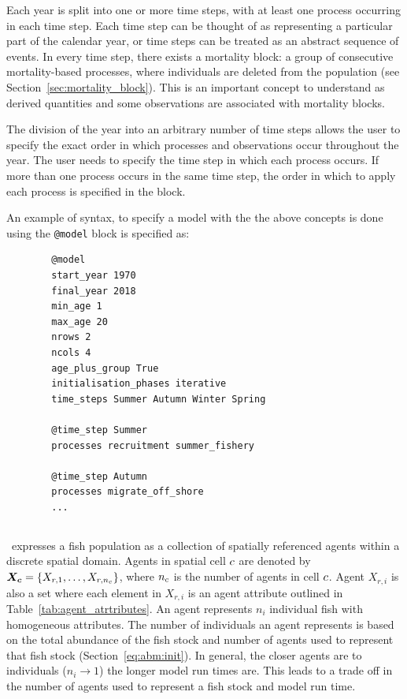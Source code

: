 Each year is split into one or more time steps, with at least one process occurring in each time step. Each time step can be thought of as representing a particular part of the calendar year, or time steps can be treated as an abstract sequence of events. In every time step, there exists a mortality block: a group of consecutive mortality-based processes, where individuals are deleted from the population (see Section~\ref{sec:mortality_block}). This is an important concept to understand as derived quantities and some observations are associated with mortality blocks.

The division of the year into an arbitrary number of time steps allows the user to specify the exact order in which processes and observations occur throughout the year. The user needs to specify the time step in which each process occurs. If more than one process occurs in the same time step, the order in which to apply each process is specified in the  block.


An example of syntax, to specify a model with the the above concepts is done using the \texttt{@model} block is specified as:
{\small{\begin{verbatim}
		@model
		start_year 1970
		final_year 2018
		min_age 1
		max_age 20
		nrows 2
		ncols 4
		age_plus_group True
		initialisation_phases iterative
		time_steps Summer Autumn Winter Spring
		
		@time_step Summer
		processes recruitment summer_fishery 

		@time_step Autumn
		processes migrate_off_shore
		...
\end{verbatim}}}


\subsection{\label{sec:individuals}}
\IBM\ expresses a fish population as a collection of spatially referenced agents within a discrete spatial domain. Agents in spatial cell \(c\) are denoted by \(\bm{X_c} = \{X_{r,1}, \dots, X_{r, n_c}\}\), where \({n_c}\) is the number of agents in cell \(c\). Agent \(X_{r,i}\) is also a set where each element in \(X_{r,i}\) is an agent attribute outlined in Table~\ref{tab:agent_atrtributes}. An agent represents \(n_i\) individual fish with homogeneous attributes. The number of individuals an agent represents is based on the total abundance of the fish stock and number of agents used to represent that fish stock (Section~\ref{eq:abm:init}). In general, the closer agents are to individuals (\(n_i \rightarrow 1\)) the longer model run times are. This leads to a trade off in the number of agents used to represent a fish stock and model run time.


